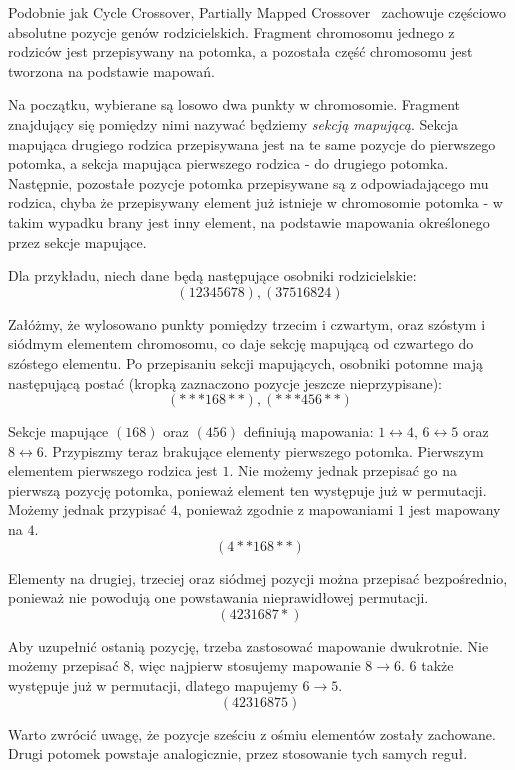 \documentclass[brudnopis]{xmgr}
\begin{document}
Podobnie jak Cycle Crossover, Partially Mapped Crossover~\cite{Larranaga99geneticalgorithms} zachowuje częściowo absolutne pozycje genów rodzicielskich. Fragment chromosomu jednego z rodziców jest przepisywany na potomka, a pozostała część chromosomu jest tworzona na podstawie mapowań.

Na początku, wybierane są losowo dwa punkty w chromosomie. Fragment znajdujący się pomiędzy nimi nazywać będziemy \emph{sekcją mapującą}. Sekcja mapująca drugiego rodzica przepisywana jest na te same pozycje do pierwszego potomka, a sekcja mapująca pierwszego rodzica - do drugiego potomka. Następnie, pozostałe pozycje potomka przepisywane są z odpowiadającego mu rodzica, chyba że przepisywany element już istnieje w chromosomie potomka - w takim wypadku brany jest inny element, na podstawie mapowania określonego przez sekcje mapujące.

Dla przykładu, niech dane będą następujące osobniki rodzicielskie:
$$ (1 2 3 4 5 6 7 8), (3 7 5 1 6 8 2 4) $$

Załóżmy, że wylosowano punkty pomiędzy trzecim i czwartym, oraz szóstym i siódmym elementem chromosomu, co daje sekcję mapującą od czwartego do szóstego elementu. Po przepisaniu sekcji mapujących, osobniki potomne mają następującą postać (kropką zaznaczono pozycje jeszcze nieprzypisane):
$$ (* * * 1 6 8 * *), (* * * 4 5 6 * *) $$

Sekcje mapujące $ (1 6 8) $ oraz $ (4 5 6) $ definiują mapowania: $ 1 \leftrightarrow 4 $, $ 6 \leftrightarrow 5 $ oraz $ 8 \leftrightarrow 6 $. Przypiszmy teraz brakujące elementy pierwszego potomka. Pierwszym elementem pierwszego rodzica jest $1$. Nie możemy jednak przepisać go na pierwszą pozycję potomka, ponieważ element ten występuje już w permutacji. Możemy jednak przypisać $4$, ponieważ zgodnie z mapowaniami $1$ jest mapowany na $4$.
$$ (4 * * 1 6 8 * *) $$

Elementy na drugiej, trzeciej oraz siódmej pozycji można przepisać bezpośrednio, ponieważ nie powodują one powstawania nieprawidłowej permutacji.
$$ (4 2 3 1 6 8 7 *) $$

Aby uzupełnić ostanią pozycję, trzeba zastosować mapowanie dwukrotnie. Nie możemy przepisać $8$, więc najpierw stosujemy mapowanie $8 \rightarrow 6$. $6$ także występuje już w permutacji, dlatego mapujemy $6 \rightarrow 5$.
$$ (4 2 3 1 6 8 7 5) $$

Warto zwrócić uwagę, że pozycje sześciu z ośmiu elementów zostały zachowane. Drugi potomek powstaje analogicznie, przez stosowanie tych samych reguł.
\end{document}
